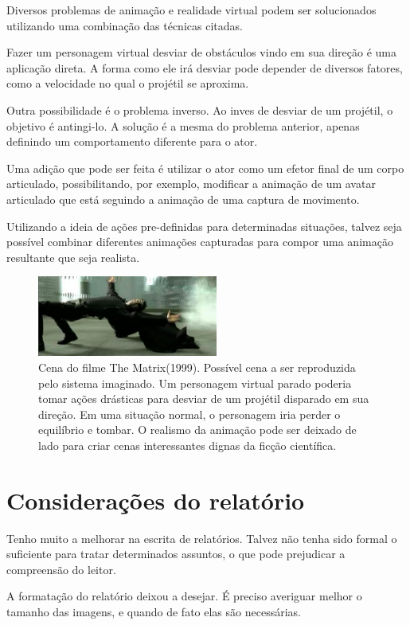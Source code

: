 \documentclass{article}
\begin{document}
Diversos problemas de animação e realidade virtual podem ser solucionados utilizando uma combinação das técnicas citadas.

Fazer um personagem virtual desviar de obstáculos vindo em sua direção é uma aplicação direta. A forma como ele irá desviar pode depender de diversos fatores, como a velocidade no qual o projétil se aproxima.

Outra possibilidade é o problema inverso. Ao inves de desviar de um projétil, o objetivo é antingi-lo. A solução é a mesma do problema anterior, apenas definindo um comportamento diferente para o ator.

Uma adição que pode ser feita é utilizar o ator como um efetor final de um corpo articulado, possibilitando, por exemplo, modificar a animação de um avatar articulado que está seguindo a animação de uma captura de movimento.

Utilizando a ideia de ações pre-definidas para determinadas situações, talvez seja possível combinar diferentes animações capturadas para compor uma animação resultante que seja realista.

\begin{figure}[ht]
  \centering
  \includegraphics[height=100px]{images/the-matrix-bullet.jpg}
  \caption{Cena do filme The Matrix(1999). Possível cena a ser reproduzida pelo sistema imaginado. Um personagem virtual parado poderia tomar ações drásticas para desviar de um projétil disparado em sua direção. Em uma situação normal, o personagem iria perder o equilíbrio e tombar. O realismo da animação pode ser deixado de lado para criar cenas interessantes dignas da ficção científica.}
  \label{fig:matrix}
\end{figure}

\section{Considerações do relatório}

Tenho muito a melhorar na escrita de relatórios. Talvez não tenha sido formal o suficiente para tratar determinados assuntos, o que pode prejudicar a compreensão do leitor.

A formatação do relatório deixou a desejar. É preciso averiguar melhor o tamanho das imagens, e quando de fato elas são necessárias.
\end{document}
